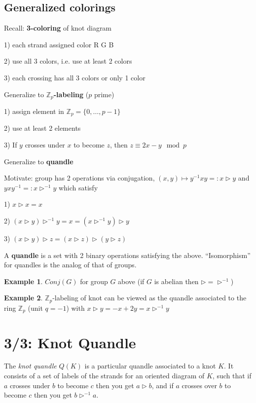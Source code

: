 \documentclass[11pt]{article}
\newcommand{\Z}{\mathbb{Z}}
\theoremstyle{plain}
\theoremstyle{definition}
\newtheorem{ex}{Example}
\begin{document}
\subsection{Generalized colorings}

Recall: \textbf{3-coloring} of knot diagram

1) each strand assigned color R G B

2) use all 3 colors, i.e. use at least 2 colors

3) each crossing has all 3 colors or only 1 color

\bigskip\noindent
Generalize to \textbf{$\Z_p$-labeling} ($p$ prime)

1) assign element in $\Z_p=\lbrace0,\ldots,p-1\rbrace$

2) use at least 2 elements

3) If $y$ crosses under $x$ to become $z$, then $z\equiv 2x-y\mod p$

\bigskip\noindent
Generalize to \textbf{quandle}

Motivate: group has 2 operations via conjugation, $(x,y)\mapsto y^{-1}xy=:x\rhd y$ and $yxy^{-1}=:x\rhd^{-1}y$ which satisfy

1) $x\rhd x=x$

2) $(x\rhd y)\rhd^{-1}y=x=(x\rhd^{-1}y)\rhd y$

3) $(x\rhd y)\rhd z=(x\rhd z)\rhd(y\rhd z)$

A \textbf{quandle} is a set with 2 binary operations satisfying the above. ``Isomorphism'' for quandles is the analog of that of groups.

\begin{ex}
$Conj(G)$ for group $G$ above (if $G$ is abelian then $\rhd=\rhd^{-1}$)
\end{ex}

\begin{ex}
$\Z_p$-labeling of knot can be viewed as the quandle associated to the ring $\Z_p$ (unit $q=-1$) with $x\rhd y=-x+2y=x\rhd^{-1}y$
\end{ex}




\clearpage
\section{3/3: Knot Quandle}

The \textit{knot quandle} $Q(K)$ is a particular quandle associated to a knot $K$. It consists of a set of labels of the strands for an oriented diagram of $K$, such that if $a$ crosses under $b$ to become $c$ then you get $a\rhd b$, and if $a$ crosses over $b$ to become $c$ then you get $b\rhd^{-1}a$.
\end{document}
